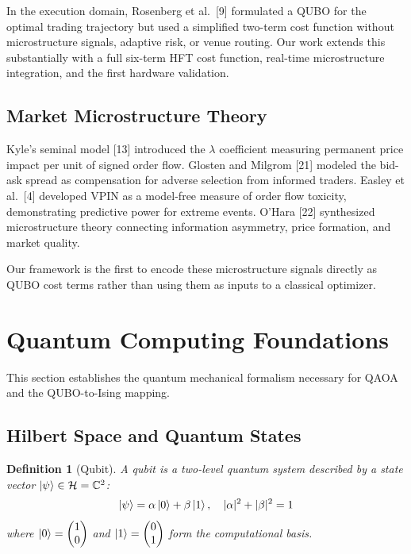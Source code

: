 \documentclass[11pt]{article}
\newcommand{\C}{\mathbb{C}}
\newcommand{\Hilbert}{\mathcal{H}}
\newtheorem{definition}{Definition}
\begin{document}
In the execution domain, Rosenberg et al.\ [9] formulated a QUBO for the optimal trading trajectory but used a simplified two-term cost function without microstructure signals, adaptive risk, or venue routing. Our work extends this substantially with a full six-term HFT cost function, real-time microstructure integration, and the first hardware validation.

\subsection{Market Microstructure Theory}

Kyle's seminal model [13] introduced the $\lambda$ coefficient measuring permanent price impact per unit of signed order flow. Glosten and Milgrom [21] modeled the bid-ask spread as compensation for adverse selection from informed traders. Easley et al.\ [4] developed VPIN as a model-free measure of order flow toxicity, demonstrating predictive power for extreme events. O'Hara [22] synthesized microstructure theory connecting information asymmetry, price formation, and market quality.

Our framework is the first to encode these microstructure signals directly as QUBO cost terms rather than using them as inputs to a classical optimizer.


\section{Quantum Computing Foundations}
\label{sec:quantum_foundations}

This section establishes the quantum mechanical formalism necessary for QAOA and the QUBO-to-Ising mapping.

\subsection{Hilbert Space and Quantum States}

\begin{definition}[Qubit]
A qubit is a two-level quantum system described by a state vector $\ket{\psi} \in \Hilbert = \C^2$:
\begin{equation}
\ket{\psi} = \alpha\ket{0} + \beta\ket{1}, \quad |\alpha|^2 + |\beta|^2 = 1
\end{equation}
where $\ket{0} = \begin{pmatrix} 1 \\ 0 \end{pmatrix}$ and $\ket{1} = \begin{pmatrix} 0 \\ 1 \end{pmatrix}$ form the computational basis.
\end{definition}
\end{document}
